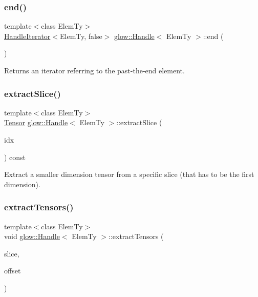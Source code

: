 \subsubsection{\texorpdfstring{end()}{end()}}
{\footnotesize\ttfamily template$<$class Elem\+Ty$>$ \\
\hyperlink{classglow_1_1_handle_iterator}{Handle\+Iterator}$<$Elem\+Ty, false$>$ \hyperlink{classglow_1_1_handle}{glow\+::\+Handle}$<$ Elem\+Ty $>$\+::end (\begin{DoxyParamCaption}{ }\end{DoxyParamCaption})\hspace{0.3cm}{\ttfamily [inline]}}

\begin{DoxyReturn}{Returns}
an iterator referring to the past-\/the-\/end element. 
\end{DoxyReturn}
\mbox{\label{classglow_1_1_handle_a602cde4751f83f7a3b11a3b099ade080}} 
\subsubsection{\texorpdfstring{extract\+Slice()}{extractSlice()}}
{\footnotesize\ttfamily template$<$class Elem\+Ty$>$ \\
\hyperlink{classglow_1_1_tensor}{Tensor} \hyperlink{classglow_1_1_handle}{glow\+::\+Handle}$<$ Elem\+Ty $>$\+::extract\+Slice (\begin{DoxyParamCaption}\item[{size\+\_\+t}]{idx }\end{DoxyParamCaption}) const\hspace{0.3cm}{\ttfamily [inline]}}

Extract a smaller dimension tensor from a specific slice (that has to be the first dimension). \mbox{\label{classglow_1_1_handle_ae4ce4936e95b70768a705074098e0f30}} 
\subsubsection{\texorpdfstring{extract\+Tensors()}{extractTensors()}}
{\footnotesize\ttfamily template$<$class Elem\+Ty$>$ \\
void \hyperlink{classglow_1_1_handle}{glow\+::\+Handle}$<$ Elem\+Ty $>$\+::extract\+Tensors (\begin{DoxyParamCaption}\item[{\hyperlink{classglow_1_1_handle}{Handle}$<$ Elem\+Ty $>$ \&}]{slice,  }\item[{llvm\+::\+Array\+Ref$<$ size\+\_\+t $>$}]{offset }\end{DoxyParamCaption})\hspace{0.3cm}{\ttfamily [inline]}}

